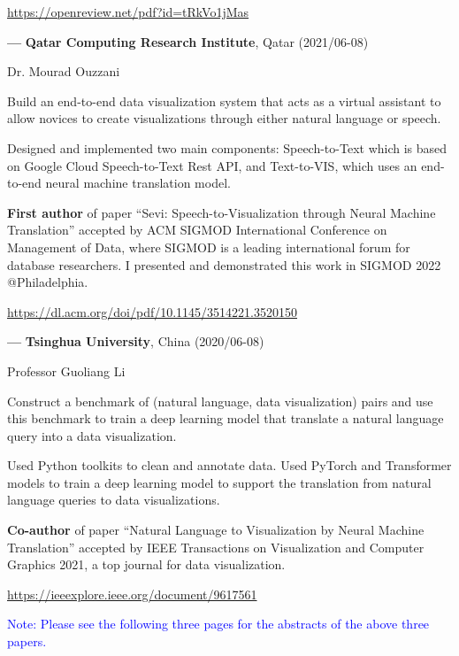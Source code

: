 \documentclass[10pt,a4paper,sans]{./moderncv/moderncv}
\begin{document}
{\textcolor{blue}{\url{https://openreview.net/pdf?id=tRkVo1jMas}}}

\vspace{2ex}
\cvline
{\textbf{\Large ---}}
{\large\textbf{Qatar Computing Research Institute}, Qatar (2021/06-08)}

{Dr. Mourad Ouzzani}

{Build an end-to-end data visualization system that acts as a virtual assistant to allow novices to create visualizations through either natural language or speech.}

{Designed and implemented two main components: Speech-to-Text which is based on Google Cloud Speech-to-Text Rest API, and Text-to-VIS, which uses an end-to-end neural machine translation model.}

{\textbf{First author} of paper ``Sevi: Speech-to-Visualization through Neural Machine Translation'' accepted by ACM SIGMOD International Conference on Management of Data, where SIGMOD is a leading international forum for database researchers. I presented and demonstrated this work in SIGMOD 2022 @Philadelphia.}

{\textcolor{blue}{\url{https://dl.acm.org/doi/pdf/10.1145/3514221.3520150}}}

\vspace{2ex}
\cvline
{\textbf{\Large ---}}
{\large\textbf{Tsinghua University}, China (2020/06-08)}


{Professor Guoliang Li}

{Construct a benchmark of (natural language, data visualization) pairs and use this benchmark to train a deep learning model that translate a natural language query into a data visualization.}

{Used Python toolkits to clean and annotate data. Used PyTorch and Transformer models to train a deep learning model to support the translation from natural language queries to data visualizations.}

{\textbf{Co-author} of paper ``Natural Language to Visualization by Neural Machine Translation'' accepted by IEEE Transactions on Visualization and Computer Graphics 2021, a top journal for data visualization.}

{\textcolor{blue}{\url{https://ieeexplore.ieee.org/document/9617561}}}

\vspace{2ex}

\textcolor{blue}{Note: Please see the following three pages for the abstracts of the above three papers.}
\end{document}
